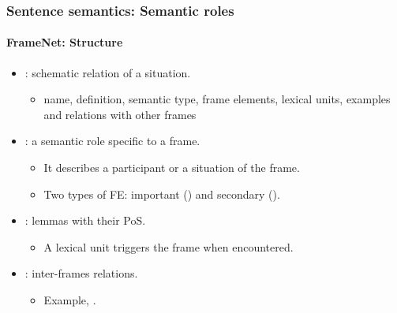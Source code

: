 \documentclass[xcolor=table]{beamer}
\begin{document}
\begin{frame}
	\frametitle{Sentence semantics: Semantic roles}
	\framesubtitle{FrameNet: Structure}
	
	\begin{itemize}
		\item {}: schematic relation of a situation.
		\begin{itemize}
			\item name, definition, semantic type, frame elements, lexical units, examples and relations with other frames
		\end{itemize}
	
		\item {}: a semantic role specific to a frame. 
		\begin{itemize}
			\item It describes a participant or a situation of the frame.
			\item Two types of FE: important () and secondary ().
		\end{itemize}
	
		\item {}: lemmas with their PoS.
		\begin{itemize}
			\item A lexical unit triggers the frame when encountered.
		\end{itemize}
	
		\item {}: inter-frames relations.
		\begin{itemize}
			\item Example, .
		\end{itemize}
	\end{itemize}
	
\end{frame}
\end{document}
